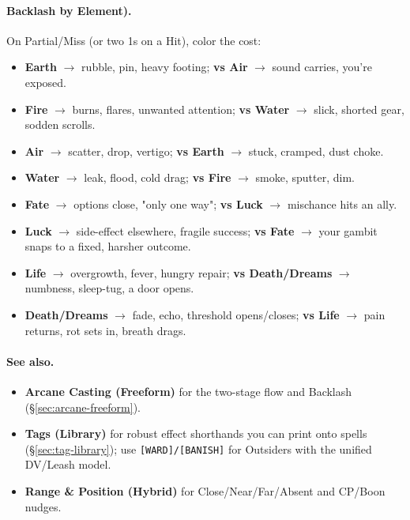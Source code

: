 \documentclass[11pt]{article}
\begin{document}
\paragraph{Backlash by Element).}
On Partial/Miss (or two 1s on a Hit), color the cost:
\begin{itemize}
  \item \textbf{Earth} $\rightarrow$ rubble, pin, heavy footing; \textbf{vs Air} $\rightarrow$ sound carries, you're exposed.
  \item \textbf{Fire} $\rightarrow$ burns, flares, unwanted attention; \textbf{vs Water} $\rightarrow$ slick, shorted gear, sodden scrolls.
  \item \textbf{Air} $\rightarrow$ scatter, drop, vertigo; \textbf{vs Earth} $\rightarrow$ stuck, cramped, dust choke.
  \item \textbf{Water} $\rightarrow$ leak, flood, cold drag; \textbf{vs Fire} $\rightarrow$ smoke, sputter, dim.
  \item \textbf{Fate} $\rightarrow$ options close, "only one way"; \textbf{vs Luck} $\rightarrow$ mischance hits an ally.
  \item \textbf{Luck} $\rightarrow$ side-effect elsewhere, fragile success; \textbf{vs Fate} $\rightarrow$ your gambit snaps to a fixed, harsher outcome.
  \item \textbf{Life} $\rightarrow$ overgrowth, fever, hungry repair; \textbf{vs Death/Dreams} $\rightarrow$ numbness, sleep-tug, a door opens.
  \item \textbf{Death/Dreams} $\rightarrow$ fade, echo, threshold opens/closes; \textbf{vs Life} $\rightarrow$ pain returns, rot sets in, breath drags.
\end{itemize}

\bigskip


\paragraph{See also.}
\begin{itemize}
  \item \textbf{Arcane Casting (Freeform)} for the two-stage flow and Backlash (\S\ref{sec:arcane-freeform}).
  \item \textbf{Tags (Library)} for robust effect shorthands you can print onto spells (\S\ref{sec:tag-library}); use \texttt{[WARD]/[BANISH]} for Outsiders with the unified DV/Leash model.
  \item \textbf{Range \& Position (Hybrid)} for Close/Near/Far/Absent and CP/Boon nudges.
\end{itemize}
\end{document}
